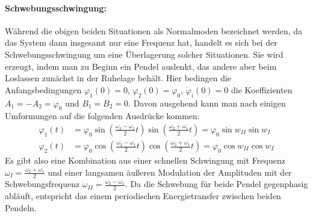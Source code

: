 \paragraph{Schwebungsschwingung:}
Während die obigen beiden Situationen als Normalmoden bezeichnet werden, da das System dann insgesamt nur eine Frequenz hat, handelt es sich bei der Schwebungsschwingung um eine Überlagerung solcher Situationen. Sie wird erzeugt, indem man zu Beginn ein Pendel auslenkt, das andere aber beim Loslassen zunächst in der Ruhelage behält. Hier bedingen die Anfangsbedingungen \(\varphi_1(0) = 0\), \(\varphi_2(0) = \varphi_0\), \(\dot{\varphi}_i(0) = 0\) die Koeffizienten \(A_1 = -A_2 = \varphi_0\) und \(B_1=B_2=0\). Davon ausgehend kann man nach einigen Umformungen auf die folgenden Ausdrücke kommen:
\begin{subequations}
    \begin{align}
\varphi_1(t) &= \varphi_0 \sin{\left(\frac{\omega_2 - \omega_1}{2} t\right)}
\sin{\left(\frac{\omega_2 + \omega_1}{2} t\right)}=\varphi_0\sin{w_{II}}\sin{w_I}\label{eq:phi1}\\
\varphi_2(t) &= \varphi_0 \cos{\left(\frac{\omega_2 - \omega_1}{2} t\right)}
\cos{\left(\frac{\omega_2 + \omega_1}{2} t\right)}=\varphi_0\cos{w_{II}}\cos{w_I}\label{eq:phi2}
    \end{align}
\end{subequations}
Es gibt also eine Kombination aus einer schnellen Schwingung mit Frequenz \(\omega_I = \frac{\omega_2 + \omega_1}{2}\) und einer langsamen äußeren Modulation der Amplituden mit der Schwebungsfrequenz \(\omega_{II} = \frac{\omega_2 - \omega_1}{2}\). Da die Schwebung für beide Pendel gegenphasig abläuft, entspricht das einem periodischen Energietransfer zwischen beiden Pendeln.

